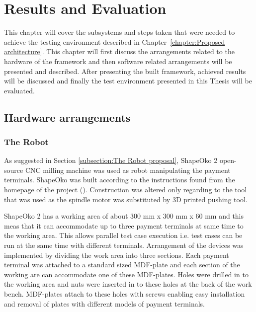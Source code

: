 
\chapter{Results and Evaluation}
\label{chapter:Results and Evaluation}

This chapter will cover the subsystems and steps taken that were needed to achieve the testing environment described in Chapter~\ref{chapter:Proposed architecture}. This chapter will first discuss the arrangements related to the hardware of the framework and then software related arrangements will be presented and described. After presenting the built framework, achieved results will be discussed and finally the test environment presented in this Thesis will be evaluated.

\section{Hardware arrangements}
\label{section:Hardware arrangements}

\subsection{The Robot}
\label{subsection:Robot}

As suggested in Section \ref{subsection:The Robot proposal}, ShapeOko 2 open-source CNC milling machine was used as robot manipulating the payment terminals. ShapeOko was built according to the instructions found from the homepage of the project (\emph{\cite{shapeoko}}). Construction was altered only regarding to the tool that was used as the spindle motor was substituted by 3D printed pushing tool.

ShapeOko 2 has a working area of about 300 mm x 300 mm x 60 mm and this meas that it can accommodate up to three payment terminals at same time to the working area. This allows parallel test case execution i.e. test cases can be run at the same time with different terminals. Arrangement of the devices was implemented by dividing the work area into three sections. Each payment terminal was attached to a standard sized MDF-plate and each section of the working are can accommodate one of these MDF-plates. Holes were drilled in to the working area and nuts were inserted in to these holes at the back of the work bench. MDF-plates attach to these holes with screws enabling easy installation and removal of plates with different models of payment terminals.

